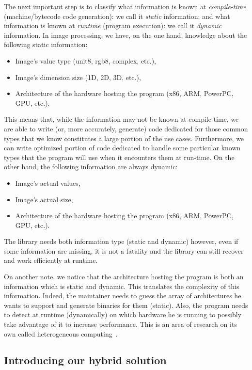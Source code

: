 The next important step is to classify what information is known at \emph{compile-time} (machine/bytecode code
generation): we call it \emph{static} information; and what information is known at \emph{runtime} (program execution):
we call it \emph{dynamic} information. In image processing, we have, on the one hand, knowledge about the following
static information:
\begin{itemize}
  \item Image's value type (unit8, rgb8, complex, etc.),
  \item Image's dimension size (1D, 2D, 3D, etc.),
  \item Architecture of the hardware hosting the program (x86, ARM, PowerPC, GPU, etc.).
\end{itemize}
This means that, while the information may not be known at compile-time, we are able to write (or, more accurately,
generate) code dedicated for those common types that we know constitutes a large portion of the use cases. Furthermore,
we can write optimized portion of code dedicated to handle some particular known types that the program will use when it
encounters them at run-time.
On the other hand, the following information are always dynamic:
\begin{itemize}
  \item Image's actual values,
  \item Image's actual size,
  \item Architecture of the hardware hosting the program (x86, ARM, PowerPC, GPU, etc.).
\end{itemize}
The library needs both information type (static and dynamic) however, even if some information are missing, it is not a
fatality and the library can still recover and work efficiently at runtime.

On another note, we notice that the architecture hosting the program is both an information which is static and dynamic.
This translates the complexity of this information. Indeed, the maintainer needs to guess the array of architectures he
wants to support and generate binaries for them (static). Also, the program needs to detect at runtime (dynamically) on
which hardware he is running to possibly take advantage of it to increase performance. This is an area of research on
its own called heterogeneous computing~\parencite{wong.2019.heterogeneous,brown.2019.heterogeneous}.


\subsection{Introducing our hybrid solution}

